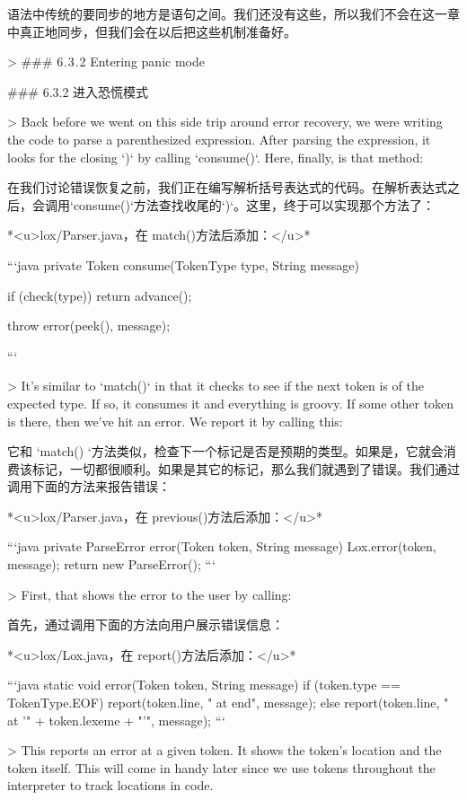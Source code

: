 \documentclass[cn,11pt,chinese]{elegantbook}
\begin{document}
语法中传统的要同步的地方是语句之间。我们还没有这些，所以我们不会在这一章中真正地同步，但我们会在以后把这些机制准备好。

> ### 6 . 3 . 2 Entering panic mode

### 6.3.2 进入恐慌模式

> Back before we went on this side trip around error recovery, we were writing the code to parse a parenthesized expression. After parsing the expression, it looks for the closing `)` by calling `consume()`. Here, finally, is that method:

在我们讨论错误恢复之前，我们正在编写解析括号表达式的代码。在解析表达式之后，会调用`consume()`方法查找收尾的`)`。这里，终于可以实现那个方法了：

*<u>lox/Parser.java，在 match()方法后添加：</u>*

```java
  private Token consume(TokenType type, String message) {
    if (check(type)) return advance();

    throw error(peek(), message);
  }
```

> It’s similar to `match()` in that it checks to see if the next token is of the expected type. If so, it consumes it and everything is groovy. If some other token is there, then we’ve hit an error. We report it by calling this:

它和 `match() `方法类似，检查下一个标记是否是预期的类型。如果是，它就会消费该标记，一切都很顺利。如果是其它的标记，那么我们就遇到了错误。我们通过调用下面的方法来报告错误：

*<u>lox/Parser.java，在 previous()方法后添加：</u>*

```java
  private ParseError error(Token token, String message) {
    Lox.error(token, message);
    return new ParseError();
  }
```

> First, that shows the error to the user by calling:

首先，通过调用下面的方法向用户展示错误信息：

*<u>lox/Lox.java，在 report()方法后添加：</u>*

```java
  static void error(Token token, String message) {
    if (token.type == TokenType.EOF) {
      report(token.line, " at end", message);
    } else {
      report(token.line, " at '" + token.lexeme + "'", message);
    }
  }
```

> This reports an error at a given token. It shows the token’s location and the token itself. This will come in handy later since we use tokens throughout the interpreter to track locations in code.
\end{document}
